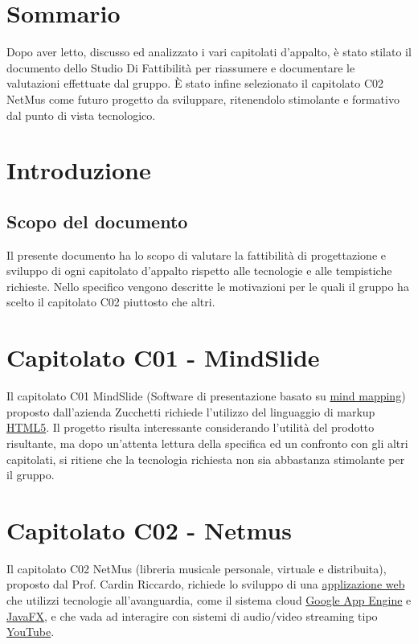 \tableofcontents

\chapter*{Sommario}
\thispagestyle{fancy} %
Dopo aver letto, discusso ed analizzato i vari capitolati d'appalto, \`e
stato stilato il documento dello Studio Di Fattibilit\`a per riassumere e
documentare le valutazioni effettuate dal gruppo. \`E stato infine selezionato
il capitolato C02 NetMus come futuro progetto da sviluppare, ritenendolo
stimolante e formativo dal punto di vista tecnologico.


\chapter{Introduzione}
\thispagestyle{fancy} %

\section{Scopo del documento}
Il presente documento ha lo scopo di valutare la fattibilit\`a di progettazione
e sviluppo di ogni capitolato d'appalto rispetto alle tecnologie e alle
tempistiche richieste. Nello specifico vengono descritte le motivazioni per le
quali il gruppo ha scelto il capitolato C02 piuttosto che altri.




\chapter{Capitolato C01 - MindSlide}
\thispagestyle{fancy}
Il capitolato C01 MindSlide (Software di presentazione basato su \underline{mind
mapping}) proposto dall'azienda Zucchetti richiede l'utilizzo del linguaggio di
markup \underline{HTML5}.
Il progetto risulta interessante considerando l'utilit\`a del prodotto
risultante, ma dopo un'attenta lettura della specifica ed un confronto con gli
altri capitolati, si ritiene che la tecnologia richiesta non sia abbastanza
stimolante per il gruppo.

\chapter{Capitolato C02 - Netmus}
\thispagestyle{fancy}
Il capitolato C02 NetMus (libreria musicale personale, virtuale e distribuita),
proposto dal Prof. Cardin Riccardo, richiede lo sviluppo di una
\underline{applizazione web} che utilizzi tecnologie all'avanguardia, come il
sistema cloud \underline{Google App Engine} e \underline{JavaFX}, e che vada ad
interagire con sistemi di audio/video streaming tipo \underline{YouTube}.\\

